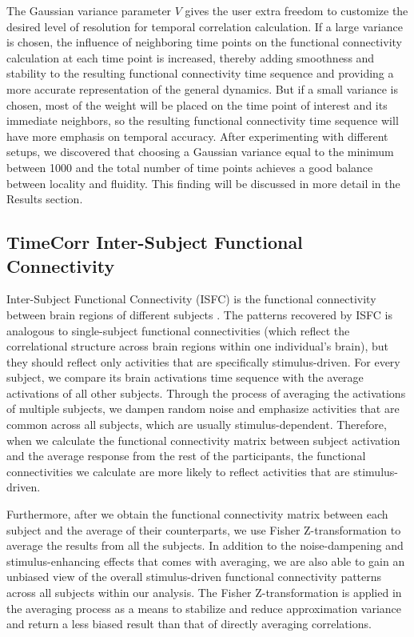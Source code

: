 \documentclass[11pt]{article}
\begin{document}
The Gaussian variance parameter $V$ gives the user extra freedom to customize the desired level of resolution for temporal correlation calculation. If a large variance is chosen, the influence of neighboring time points on the functional connectivity calculation at each time point is increased, thereby adding smoothness and stability to the resulting functional connectivity time sequence and providing a more accurate representation of the general dynamics. But if a small variance is chosen, most of the weight will be placed on the time point of interest and its immediate neighbors, so the resulting functional connectivity time sequence will have more emphasis on temporal accuracy. After experimenting with different setups, we discovered that choosing a Gaussian variance equal to the minimum between 1000 and the total number of time points achieves a good balance between locality and fluidity. This finding will be discussed in more detail in the Results section.

\subsection{TimeCorr Inter-Subject Functional Connectivity}

Inter-Subject Functional Connectivity (ISFC) is the functional connectivity between brain regions of different subjects \citep{jeremy2017,hasson2016}. The patterns recovered by ISFC is analogous to single-subject functional connectivities (which reflect the correlational structure across brain regions within one individual's
brain), but they should reflect only activities that are specifically stimulus-driven. For every subject, we compare its brain activations time sequence with the average activations of all other subjects. Through the process of averaging the activations of multiple subjects, we dampen random noise and emphasize activities that are common across all subjects, which are usually stimulus-dependent. Therefore, when we calculate the functional connectivity matrix between subject activation and the average response from the rest of the participants, the functional connectivities we calculate are more likely to reflect activities that are stimulus-driven.

Furthermore, after we obtain the functional connectivity matrix between each subject and the average of their counterparts, we use Fisher Z-transformation to average the results from all the subjects. In addition to the noise-dampening and stimulus-enhancing effects that comes with averaging, we are also able to gain an unbiased view of the overall stimulus-driven functional connectivity patterns across all subjects within our analysis. The Fisher Z-transformation is applied in the averaging process as a means to stabilize and reduce approximation variance and return a less biased result than that of directly averaging correlations.
\end{document}
